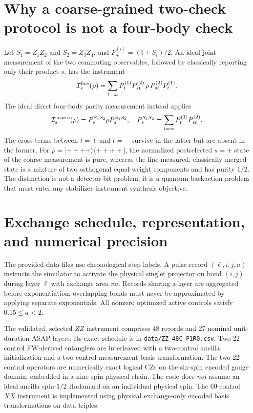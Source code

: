\documentclass[aps,prx,onecolumn,10pt]{revtex4-2}
\newcommand{\id}{\mathbb I}
\newcommand{\Ical}{\mathcal I}
\begin{document}
\section{Why a coarse-grained two-check protocol is not a four-body check}
Let $S_1=Z_1Z_2$ and $S_2=Z_3Z_4$, and $P^{(i)}_\pm=(\id\pm S_i)/2$. An ideal joint measurement of the two commuting observables, followed by classically reporting only their product $s$, has the instrument
\begin{equation}
 \Ical_s^{\rm fine}(\rho)=\sum_{t=\pm} P^{(1)}_t P^{(2)}_{st}\,\rho\,P^{(2)}_{st}P^{(1)}_t.
\end{equation}
The ideal direct four-body parity measurement instead applies
\begin{equation}
 \Ical_s^{\rm coarse}(\rho)=P^{S_1S_2}_s\rho P^{S_1S_2}_s,\quad P^{S_1S_2}_s=\sum_{t=\pm}P^{(1)}_tP^{(2)}_{st}.
\end{equation}
The cross terms between $t=+$ and $t=-$ survive in the latter but are absent in the former. For $\rho=|++++\rangle\langle++++|$, the normalized postselected $s=+$ state of the coarse measurement is pure, whereas the fine-measured, classically merged state is a mixture of two orthogonal equal-weight components and has purity $1/2$. The distinction is not a detector-bit problem; it is a quantum backaction problem that must enter any stabilizer-instrument synthesis objective.

\section{Exchange schedule, representation, and numerical precision}
The provided data files use chronological step labels. A pulse record $(\ell,i,j,a)$ instructs the simulator to activate the physical singlet projector on bond $(i,j)$ during layer $\ell$ with exchange area $\pi a$. Records sharing a layer are aggregated before exponentiation; overlapping bonds must never be approximated by applying separate exponentials. All nonzero optimized active controls satisfy $0.15\leq a<2$.

The validated, selected $ZZ$ instrument comprises 48 records and 27 nominal unit-duration ASAP layers. Its exact schedule is in \texttt{data/ZZ\_48C\_P1R0.csv}. Two 22-control FW-derived entanglers are interleaved with a two-control ancilla initialization and a two-control measurement-basis transformation. The two 22-control operators are numerically exact logical CZs on the six-spin encoded gauge domain, embedded in a nine-spin physical chain. The code does \emph{not} assume an ideal ancilla spin-$1/2$ Hadamard on an individual physical spin. The 60-control $XX$ instrument is implemented using physical exchange-only encoded basis transformations on data triples.
\end{document}
